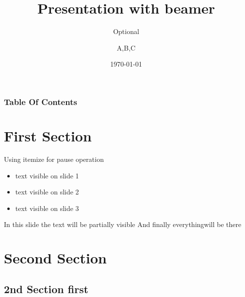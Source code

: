 \documentclass[17pt]{beamer}
\title{Presentation with beamer}
\subtitle{Optional}
\author[Author 1 ,Author 2 ,Author 3 ]{A\inst{1},B\inst{1},C\inst{2}}
\institute{
	\inst{1}MIT
	\inst{2}VIT}
\date{\today}
\begin{document}
	\frame{\titlepage}
	\begin{frame}
	\frametitle{Table Of Contents}
	\tableofcontents
\end{frame}

\section{First Section}
\begin{frame}
	Using itemize for pause operation
\begin{itemize}
	
	\item<1-2> text visible on slide 1
	\item<2->text visible on slide 2
	\item<3->text visible on slide 3
\end{itemize}
\end{frame}

\begin{frame}
In this slide \pause
 the text will be partially visible
And finally everything\pause  will be there
\end{frame}
\section{Second Section}
\subsection{2nd Section first}
\end{document}
